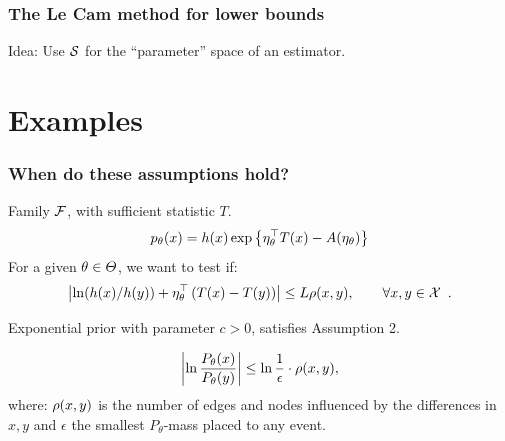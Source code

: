 \begin{frame}
  \frametitle{The Le Cam method for lower bounds}
  Idea: Use ${\mathcal{S}}$ for the ``parameter'' space of an estimator.

\end{frame}

\section{Examples}
\begin{frame}
  \frametitle{When do these assumptions hold?}
  \begin{example}
    Family $\mathcal{F}$, with sufficient statistic $T$.
    \[
    p_{\theta}(x) = h(x) \exp\left\{ \eta_{\theta}^{\top} T(x) -
      A(\eta_{\theta})\right\}
    \]
    For a given $\theta \in \Theta$, we want to test if:
    \[
    \left| \ln(h(x)/h(y)) + \eta_{\theta}^{\top}\left(T(x)-T(y)\right) \right| \le L \rho(x, y), \qquad \forall x, y \in \mathcal{{\mathcal{X}}}
    \enspace.
    \]
  \end{example}
\end{frame}

\begin{frame}
  \begin{example}
    Exponential prior with parameter $c > 0$, satisfies Assumption 2.
  \end{example}

  \begin{example}
    \[
    \left|\ln \frac{P_\theta(x)}{P_\theta(y)}\right| \leq \ln \frac{1}{\epsilon} \cdot \rho(x, y),
    \]
    where: $\rho(x, y)$ is the number of edges and nodes influenced by the differences in $x,y$
    and $\epsilon$ the smallest $P_\theta$-mass placed to any event.
  \end{example}
\end{frame}

